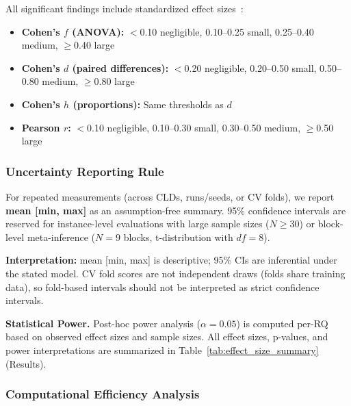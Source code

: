 All significant findings include standardized effect sizes~\cite{cohen1988statistical}:
\begin{itemize}[noitemsep]
    \item \textbf{Cohen's $f$ (ANOVA):} $<$0.10 negligible, 0.10--0.25 small, 0.25--0.40 medium, $\geq$0.40 large
    \item \textbf{Cohen's $d$ (paired differences):} $<$0.20 negligible, 0.20--0.50 small, 0.50--0.80 medium, $\geq$0.80 large
    \item \textbf{Cohen's $h$ (proportions):} Same thresholds as $d$
    \item \textbf{Pearson $r$:} $<$0.10 negligible, 0.10--0.30 small, 0.30--0.50 medium, $\geq$0.50 large
\end{itemize}

\subsubsection{Uncertainty Reporting Rule}
\label{sec:uncertainty_rule}

For repeated measurements (across CLDs, runs/seeds, or CV folds), we report \textbf{mean [min, max]} as an assumption-free summary. 95\% confidence intervals are reserved for instance-level evaluations with large sample sizes ($N \geq 30$) or block-level meta-inference ($N=9$ blocks, t-distribution with $df=8$).

\textbf{Interpretation:} mean [min, max] is descriptive; 95\% CIs are inferential under the stated model. CV fold scores are not independent draws (folds share training data), so fold-based intervals should not be interpreted as strict confidence intervals.

\textbf{Statistical Power.} Post-hoc power analysis ($\alpha = 0.05$) is computed per-RQ based on observed effect sizes and sample sizes. All effect sizes, p-values, and power interpretations are summarized in Table~\ref{tab:effect_size_summary} (Results).

\subsubsection{Computational Efficiency Analysis}
\label{sec:computational_efficiency}

